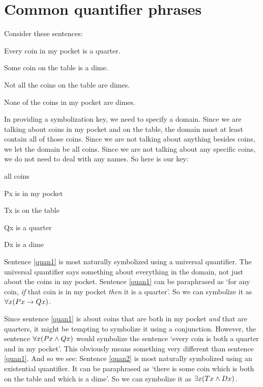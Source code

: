 \section{Common quantifier phrases}
Consider these sentences:
	\begin{earg}
		\item[\ex{quan1}] Every coin in my pocket is a quarter.
		\item[\ex{quan2}] Some coin on the table is a dime.
		\item[\ex{quan3}] Not all the coins on the table are dimes.
		\item[\ex{quan4}] None of the coins in my pocket are dimes.
	\end{earg}
In providing a symbolization key, we need to specify a domain. Since we are talking about coins in my pocket and on the table, the domain must at least contain all of those coins. Since we are not talking about anything besides coins, we let the domain be all coins. Since we are not talking about any specific coins, we do not need to deal with any names. So here is our key:
	\begin{ekey}
		\item[\text{domain}] all coins
		\item[Px]  is in my pocket
		\item[Tx]  is on the table
		\item[Qx]  is a quarter
		\item[Dx]  is a dime
	\end{ekey}
Sentence \ref{quan1} is most naturally symbolized using a universal quantifier. The universal quantifier says something about everything in the domain, not just about the coins in my pocket. Sentence \ref{quan1} can be paraphrased as `for any coin, \emph{if} that coin is in my pocket \emph{then} it is a quarter'. So we can symbolize it as $\forall x(Px \rightarrow Qx)$.

Since sentence \ref{quan1} is about coins that are both in my pocket \emph{and} that are quarters, it might be tempting to symbolize it using a conjunction. However, the sentence $\forall x(Px \mathbin{\wedge} Qx)$ would symbolize the sentence `every coin is both a quarter and in my pocket'. This obviously means something very different than sentence \ref{quan1}. And so we see:
Sentence \ref{quan2} is most naturally symbolized using an existential quantifier. It can be paraphrased as `there is some coin which is both on the table and which is a dime'. So we can symbolize it as $\exists x(Tx \mathbin{\wedge} Dx)$.

